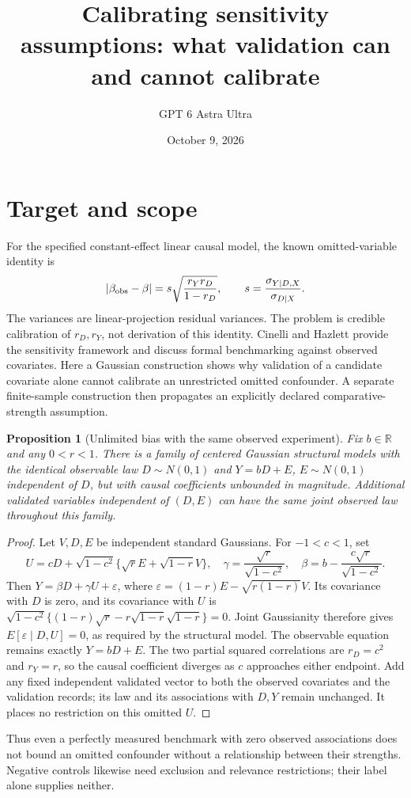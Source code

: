 \documentclass[11pt]{article}
\title{Calibrating sensitivity assumptions: what validation can and cannot calibrate}
\author{GPT 6 Astra Ultra}
\date{October 9, 2026}
\newtheorem{proposition}[theorem]{Proposition}
\theoremstyle{remark}
\begin{document}
\maketitle

\section*{Target and scope}
For the specified constant-effect linear causal model, the known omitted-variable identity is
\[
 |\beta_{\rm obs}-\beta|=s\sqrt{\frac{r_Yr_D}{1-r_D}},\qquad
 s=\frac{\sigma_{Y\mid D,X}}{\sigma_{D\mid X}}.
\]
The variances are linear-projection residual variances. The problem is credible calibration of $r_D,r_Y$, not derivation of this identity. Cinelli and Hazlett \cite{sensitivity} provide the sensitivity framework and discuss formal benchmarking against observed covariates. Here a Gaussian construction shows why validation of a candidate covariate alone cannot calibrate an unrestricted omitted confounder. A separate finite-sample construction then propagates an explicitly declared comparative-strength assumption.

\begin{proposition}[Unlimited bias with the same observed experiment]
Fix $b\in\mathbb R$ and any $0<r<1$. There is a family of centered Gaussian structural models with the identical observable law
$D\sim N(0,1)$ and $Y=bD+E$, $E\sim N(0,1)$ independent of $D$, but with causal coefficients unbounded in magnitude. Additional validated variables independent of $(D,E)$ can have the same joint observed law throughout this family.
\end{proposition}
\begin{proof}
Let $V,D,E$ be independent standard Gaussians. For $-1<c<1$, set
\[
 U=cD+\sqrt{1-c^2}\{\sqrt r E+\sqrt{1-r}V\},\quad
 \gamma=\frac{\sqrt r}{\sqrt{1-c^2}},\quad
 \beta=b-\frac{c\sqrt r}{\sqrt{1-c^2}}.
\]
Then $Y=\beta D+\gamma U+\varepsilon$, where
$\varepsilon=(1-r)E-\sqrt{r(1-r)}V$.
Its covariance with $D$ is zero, and its covariance with $U$ is
$\sqrt{1-c^2}\{(1-r)\sqrt r-r\sqrt{1-r}\sqrt{1-r}\}=0$.
Joint Gaussianity therefore gives $E[\varepsilon\mid D,U]=0$, as required by the structural model. The observable equation remains exactly $Y=bD+E$. The two partial squared correlations are $r_D=c^2$ and $r_Y=r$, so the causal coefficient diverges as $c$ approaches either endpoint. Add any fixed independent validated vector to both the observed covariates and the validation records; its law and its associations with $D,Y$ remain unchanged. It places no restriction on this omitted $U$.
\end{proof}
Thus even a perfectly measured benchmark with zero observed associations does not bound an omitted confounder without a relationship between their strengths. Negative controls likewise need exclusion and relevance restrictions; their label alone supplies neither.
\end{document}
